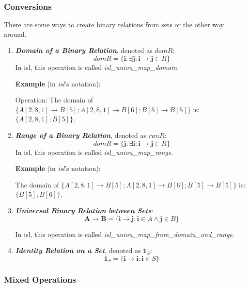 \subsubsection{Conversions}

There are some ways to create binary relations from sets or the other way around.

\begin{enumerate}

\item \textcolor{vr}{\textbf{\emph{Domain of a Binary Relation}}, denoted as $dom R$}:
$$dom R = \{ \mathbf{i} : \exists \mathbf{j}: \mathbf{i} \rightarrow \mathbf{j} \in R \}$$
In isl, this operation is called \textcolor{pg}{\emph{isl\_union\_map\_domain}}.

\textbf{Example} (in \emph{isl}'s notation):

Operation: The domain of $\{ A[2,8,1] \rightarrow B[5]; A[2,8,1] \rightarrow B[6]; B[5] \rightarrow B[5] \}$ is:
$\{ A[2,8,1]; B[5]\}$.

\item \textcolor{vr}{\textbf{\emph{Range of a Binary Relation}}, denoted as $ran R$}:
$$dom R = \{ \mathbf{j} : \exists \mathbf{i}: \mathbf{i} \rightarrow \mathbf{j} \in R \}$$
In isl, this operation is called \textcolor{pg}{\emph{isl\_union\_map\_range}}.

\textbf{Example} (in \emph{isl}'s notation):

The domain of $\{ A[2,8,1] \rightarrow B[5]; A[2,8,1] \rightarrow B[6]; B[5] \rightarrow B[5] \}$ is:
$\{ B[5]; B[6]\}$.

\item \textcolor{vr}{\textbf{\emph{Universal Binary Relation between Sets}}}:
$$ \mathbf{A} \rightarrow \mathbf{B} = \{ \mathbf{i} \rightarrow \mathbf{j} : \mathbf{i} \in A \wedge \mathbf{j} \in B \} $$

In isl, this operation is called \textcolor{pg}{\emph{isl\_union\_map\_from\_domain\_and\_range}}.

\item \textcolor{vr}{\textbf{\emph{Identity Relation on a Set}}, denoted as $\mathbf{1}_{S}$}:
$$\mathbf{1}_{S} = \{ \mathbf{i} \rightarrow \mathbf{i} : \mathbf{i} \in S \}$$

\end{enumerate}

\subsubsection{Mixed Operations}

